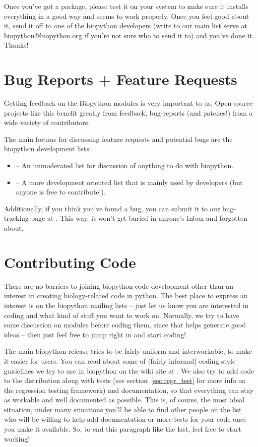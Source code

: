 \documentclass{report}
\begin{document}
Once you've got a package, please test it on your system to make sure it installs everything in a good way and seems to work properly. Once you feel good about it, send it off to one of the biopython developers (write to our main list serve at biopython@biopython.org if you're not sure who to send it to) and you've done it. Thanks!

\section{Bug Reports + Feature Requests}

Getting feedback on the Biopython modules is very important to us. Open-source projects like this benefit greatly from feedback, bug-reports (and patches!) from a wide variety of contributors.


The main forums for discussing feature requests and potential bugs are the biopython development lists:

\begin{itemize}
  \item {} -- An unmoderated list for discussion of anything to do with biopython.

  \item {} -- A more development oriented list that is mainly used by developers (but anyone is free to contribute!).
\end{itemize}

Additionally, if you think you've found a bug, you can submit it to our bug-tracking page at . This way, it won't get buried in anyone's Inbox and forgotten about.

\section{Contributing Code}

There are no barriers to joining biopython code development other than an interest in creating biology-related code in python. The best place to express an interest is on the biopython mailing lists -- just let us know you are interested in coding and what kind of stuff you want to work on. Normally, we try to have some discussion on modules before coding them, since that helps generate good ideas -- then just feel free to jump right in and start coding!


The main biopython release tries to be fairly uniform and interworkable, to make it easier for users. You can read about some of (fairly informal) coding style guidelines we try to use in biopython on the wiki site at . We also try to add code to the distribution along with tests (see section~\ref{sec:regr_test} for more info on the regression testing framework) and documentation, so that everything can stay as workable and well documented as possible. This is, of course, the most ideal situation, under many situations you'll be able to find other people on the list who will be willing to help add documentation or more tests for your code once you make it available. So, to end this paragraph like the last, feel free to start working!
\end{document}
